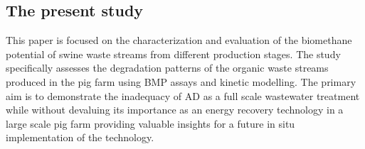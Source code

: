 \subsection{The present study}
This paper is focused on the characterization and evaluation of the biomethane potential of swine waste streams from different production stages. The study specifically assesses the degradation patterns of the organic waste streams produced in the pig farm using BMP assays and kinetic modelling. The primary aim is to demonstrate the inadequacy of AD as a full scale wastewater treatment while  without devaluing its importance as an energy recovery technology in a large scale pig farm providing valuable insights for a future in situ implementation of the technology.